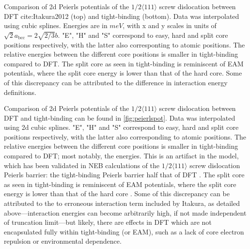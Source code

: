 \documentclass[a4paper,11pt]{article}
\begin{document}
\begin{table}
\caption{Comparison of 2d Peierls potentials of the $1/2\langle 111\rangle$ screw dislocation between DFT cite:Itakura2012 (top) and tight-binding (bottom). Data was interpolated using cubic splines. Energies are in $meV$, with x and y scales in units of $\sqrt{2} a_{\text{bcc}} = 2\sqrt{2/3}b$. "E", "H" and "S" correspond to easy, hard and split core positions respectively, with the latter also corresponting to atomic positions. The relative energies between the different core positions is smaller in tight-binding compared to DFT. The split core as seen in tight-binding is reminiscent of EAM potentials, where the split core energy is lower than that of the hard core. Some of this discrepancy can be attributed to the difference in interaction energy definitions.}
	\label{fig:peierlspot}
    \end{table}



Comparison of 2d Peierls potentials of the \(1/2\langle 111 \rangle\) screw dislocation between DFT and
tight-binding can be found in \ref{fig:peierlspot}. Data was interpolated using 2d cubic splines. "E", "H" and "S"
correspond to easy, hard and split core positions respectively, with the latter also
corresponding to atomic positions. 
The relative energies between the different core
positions is smaller in tight-binding compared to DFT; most notably, the energies. This is
an artifact in the model, which has been validated in NEB calculations of the \(1/2\langle 111\rangle\)
screw dislocation Peierls barrier: the tight-binding Peierls barrier half that of DFT
\cite{Simpson2019}. The split core as seen in tight-binding is reminiscent of EAM potentials,
where the split core energy is lower than that of the hard core \cite{Itakura2012}. Some of
this discrepancy can be attributed to the to erroneous interaction term included by Itakura,
as detailed above---interaction energies can become arbitrarily high, if not made independent of
truncation limit---but likely, there are effects in DFT which are not encapsulated fully
within tight-binding (or EAM), such as a lack of core electron repulsion or environmental
dependence. 
\end{document}
